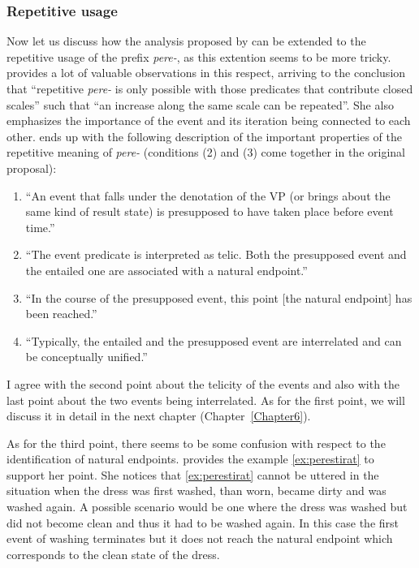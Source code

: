 \subsubsection{Repetitive usage}
Now let us discuss how the analysis proposed by \citet{Kagan:book} can be extended to the repetitive usage of the prefix \textit{pere-}, as this extention seems to be more tricky. \citet[149]{Kagan:book} provides a lot of valuable observations in this respect, arriving to the conclusion that ``repetitive \textit{pere-} is only possible with those predicates that contribute closed scales''
such that ``an increase along the same scale can be repeated''. She also emphasizes the importance of the event and its iteration being connected to each other. \citet[148]{Kagan:book} ends up with the following description of the important properties of the repetitive meaning of \textit{pere-} (conditions (2) and (3) come together in the original proposal): 
\begin{enumerate}
\item ``An event that falls under the denotation of the VP (or brings about the same kind of result state) is presupposed to have taken place before event time.'' 
\item ``The event predicate is interpreted as telic. Both the presupposed event and the entailed one are associated with a natural endpoint.'' 
\item ``In the course of the presupposed event, this point [the natural endpoint] has been reached.''
\item ``Typically, the entailed and the presupposed event are interrelated and can be conceptually unified.''
\end{enumerate}

I agree with the second point about the telicity of the events and also with the last point about the two events being interrelated. As for the first point, we will discuss it in detail in the next chapter (Chapter~\ref{Chapter6}). 

As for the third point, there seems to be some confusion with respect to the identification of natural endpoints. \citet{Kagan:book} provides the example \ref{ex:perestirat} to support her point. She notices that \ref{ex:perestirat} cannot be uttered in the situation when the dress was first washed, than worn, became dirty and was washed again. A possible scenario would be one where the dress was washed but did not become clean and thus it had to be washed again. In this case the first event of washing terminates but it does not reach the natural endpoint which corresponds to the clean state of the dress.

